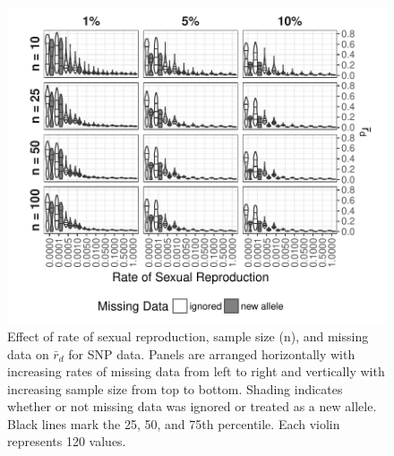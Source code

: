 \documentclass[]{article}
\theoremstyle{definition}
\theoremstyle{definition}
\theoremstyle{remark}
\begin{document}
\begin{figure}
\centering
\includegraphics[width=1.00000\textwidth]{figure/genomic_missing.pdf}
\caption{Effect of rate of sexual reproduction, sample size (n), and
missing data on \(\bar{r}_d\) for SNP data. Panels are arranged
horizontally with increasing rates of missing data from left to right
and vertically with increasing sample size from top to bottom. Shading
indicates whether or not missing data was ignored or treated as a new
allele. Black lines mark the 25, 50, and 75th percentile. Each violin
represents 120 values.}\label{fig:simmisssnp}
\end{figure}
\end{document}
